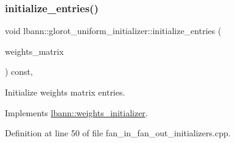 \subsubsection{\texorpdfstring{initialize\+\_\+entries()}{initialize\_entries()}}
{\footnotesize\ttfamily void lbann\+::glorot\+\_\+uniform\+\_\+initializer\+::initialize\+\_\+entries (\begin{DoxyParamCaption}\item[{\hyperlink{base_8hpp_a9a697a504ae84010e7439ffec862b470}{Abs\+Dist\+Mat} \&}]{weights\+\_\+matrix }\end{DoxyParamCaption}) const\hspace{0.3cm}{\ttfamily [override]}, {\ttfamily [virtual]}}

Initialize weights matrix entries. 

Implements \hyperlink{classlbann_1_1weights__initializer_a2ad6acf904c0c7bc7406dbd9851107be}{lbann\+::weights\+\_\+initializer}.



Definition at line 50 of file fan\+\_\+in\+\_\+fan\+\_\+out\+\_\+initializers.\+cpp.


